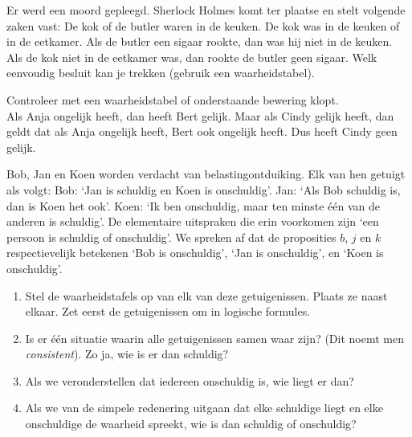 \begin{oef}
 Er werd een moord gepleegd. Sherlock Holmes komt ter plaatse en stelt volgende zaken vast:
De kok of de butler waren in de keuken.
De kok was in de keuken of in de eetkamer.
Als de butler een sigaar rookte, dan was hij niet in de keuken.
Als de kok niet in de eetkamer was, dan rookte de butler geen sigaar.
Welk eenvoudig besluit kan je trekken (gebruik een waarheidstabel).
\end{oef}

\begin{oef}
 Controleer met een waarheidstabel of onderstaande bewering klopt.\\
Als Anja ongelijk heeft, dan heeft Bert gelijk. Maar als Cindy gelijk
heeft, dan geldt dat als Anja ongelijk heeft, Bert ook ongelijk
heeft. Dus heeft Cindy geen gelijk.
\end{oef}

\begin{oef}
 Bob, Jan en Koen worden verdacht van belastingontduiking. Elk van hen getuigt als volgt:
Bob: `Jan is schuldig en Koen is onschuldig'.
Jan: `Als Bob schuldig is, dan is Koen het ook'.
Koen: `Ik ben onschuldig, maar ten minste \'{e}\'{e}n van de anderen is schuldig'.
De elementaire uitspraken die erin voorkomen zijn `een persoon is schuldig of onschuldig'. We spreken af dat de proposities $b$, $j$ en $k$ respectievelijk betekenen `Bob is onschuldig', `Jan is onschuldig', en `Koen is onschuldig'.
\begin{enumerate}
\item Stel de waarheidstafels op van elk van deze getuigenissen. Plaats ze naast elkaar. Zet eerst de getuigenissen om in logische formules.
\item Is er \'{e}\'{e}n situatie waarin alle getuigenissen samen waar zijn? (Dit noemt men \emph{consistent}). Zo ja, wie is er dan schuldig?
\item Als we veronderstellen dat iedereen onschuldig is, wie liegt er dan?
\item Als we van de simpele redenering uitgaan dat elke schuldige liegt en elke onschuldige de waarheid spreekt, wie is dan schuldig of onschuldig?
\end{enumerate}

\end{oef}

